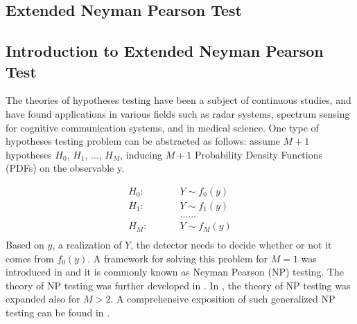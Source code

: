 \documentclass[12pt,journal,a4paper,twoside,onecolumn]{IEEEtran}
\begin{document}
\begin{spacing}{2.5}
\section{Extended Neyman Pearson Test}

\subsection{Introduction to Extended Neyman Pearson Test}
The theories of hypotheses testing have been a subject of continuous studies, and have found applications in various fields such as radar systems, spectrum sensing for cognitive communication systems, and in  medical science. One type of hypotheses testing problem can be abstracted as  follows: assume $M+1$  hypotheses $H_0$, $H_1$, ..., $H_{M}$, inducing $M+1$  Probability Density Functions (PDFs) on the observable y.

  \begin{equation}
\label{equ:hypothesis}
\begin{split}
H_0:\;\;\;\;\;\;\;\;\;&Y \sim f_0(y) \\
H_1:\;\;\;\;\;\;\;\;\;&Y \sim f_1(y)\\
&......\\
H_M:\;\;\;\;\;\;\;\;\;&Y \sim f_M(y)\\
\end{split}
\end{equation}
Based on $y$, a realization of $Y$, the detector needs to decide whether or not it comes from $f_0(y)$. A framework for solving this problem for $M=1$ was introduced in \cite{neyman1933problem} and it is commonly known as Neyman Pearson (NP) testing. The theory of NP testing was further developed in \cite{wald1939contributions}. In \cite{dantzig1951fundamental}, the theory of NP testing was  expanded also for $M>2$. A comprehensive exposition of such generalized NP testing can be found in \cite{LehmannTest}.


\end{spacing}
\end{document}
